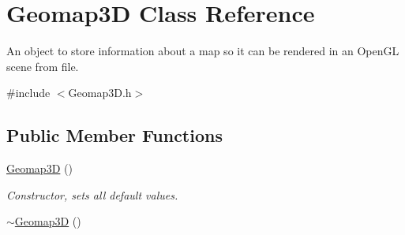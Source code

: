 \hypertarget{class_geomap3_d}{
\section{Geomap3D Class Reference}
\label{class_geomap3_d}
}


An object to store information about a map so it can be rendered in an OpenGL scene from file.  




{\ttfamily \#include $<$Geomap3D.h$>$}

\subsection*{Public Member Functions}
\begin{DoxyCompactItemize}
\item 
\hyperlink{class_geomap3_d_abf177f3756d3c6f2e90cae43aa90da6d}{Geomap3D} ()
\begin{DoxyCompactList}\small\item\em Constructor, sets all default values. \end{DoxyCompactList}\item 
\hypertarget{class_geomap3_d_a3e19ec0ce16894796a678354942a92cc}{
\hyperlink{class_geomap3_d_a3e19ec0ce16894796a678354942a92cc}{$\sim$Geomap3D} ()}
\label{class_geomap3_d_a3e19ec0ce16894796a678354942a92cc}


\end{DoxyCompactItemize}
